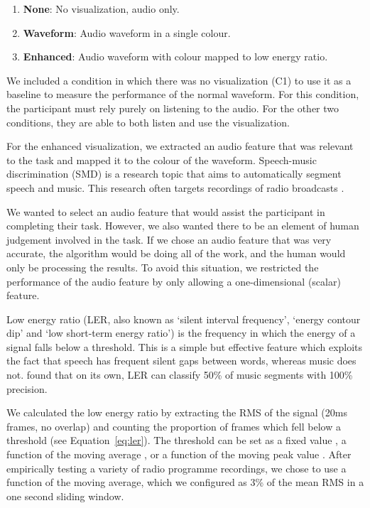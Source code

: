 \begin{enumerate}[label=C\arabic*.]
  \item \textbf{None}: No visualization, audio only.
  \item \textbf{Waveform}: Audio waveform in a single colour.
  \item \textbf{Enhanced}: Audio waveform with colour mapped to low energy ratio.
\end{enumerate}

We included a condition in which there was no visualization (C1) to use it as a baseline to measure the performance of
the normal waveform. For this condition, the participant must rely purely on listening to the audio.  For the other two
conditions, they are able to both listen and use the visualization.

For the enhanced visualization, we extracted an audio feature that was relevant to the task and mapped it to the colour
of the waveform.
Speech-music discrimination (SMD) is a research topic that aims to automatically segment speech and music.  This
research often targets recordings of radio broadcasts
\citep{Goodwin2004,Wieser2014,Saunders1996,Pikrakis2008,Pikrakis2006a}.

We wanted to select an audio feature that would assist the participant in completing their task.  However, we also
wanted there to be an element of human judgement involved in the task. If we chose an audio feature that was very
accurate, the algorithm would be doing all of the work, and the human would only be processing the results.  To avoid
this situation, we restricted the performance of the audio feature by only allowing a one-dimensional (scalar) feature.

Low energy ratio (LER, also known as `silent interval frequency', `energy contour dip' and `low short-term energy
ratio') is the frequency in which the energy of a signal falls below a threshold. This is a simple but effective
feature which exploits the fact that speech has frequent silent gaps between words, whereas music does not.
\citet{Panagiotakis2005} found that on its own, LER can classify 50\% of music segments with 100\% precision.

We calculated the low energy ratio by extracting the RMS of the signal (20ms frames, no overlap) and counting the proportion
of frames which fell below a threshold (see Equation~\ref{eq:ler}).  The threshold can be set as a fixed value
\citep{Liang2005,Panagiotakis2005}, a function of the moving average \citep{Ericsson2009}, or a function of the moving
peak value \citep{Saunders1996}.  After empirically testing a variety of radio programme recordings, we chose to use a
function of the moving average, which we configured as 3\% of the mean RMS in a one second sliding window.

